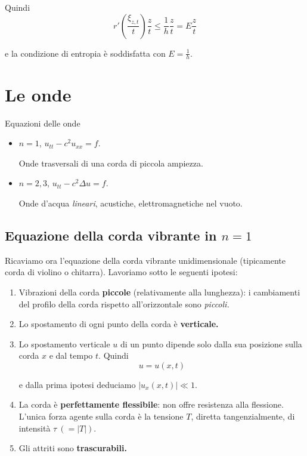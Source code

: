 \documentclass[10pt,a4paper,twoside,openright]{book}
\begin{document}
\begin{dimostrazione}
\begin{itemize}
              Quindi
              \begin{equation*}
                  r'\left(\frac{\xi _{z,t}}{t}\right)\frac{z}{t} \leqslant \frac{1}{h}\frac{z}{t} = E \frac{z}{t}
              \end{equation*}

              e la condizione di entropia è soddisfatta con $\displaystyle E=\frac{1}{h}$.
    \end{itemize}

\end{dimostrazione}

\chapter{Le onde}

Equazioni delle onde
\begin{itemize}
    \item $n=1$, $\displaystyle u_{tt} -c^{2} u_{xx} =f$.

          Onde trasversali di una corda di piccola ampiezza.
    \item $\displaystyle n=2,3$, $\displaystyle u_{tt} -c^{2} \Delta u=f$.

          Onde d'acqua \textit{lineari}, acustiche, elettromagnetiche nel vuoto.
\end{itemize}

\section{Equazione della corda vibrante in \texorpdfstring{$n=1$}{n=1}}

Ricaviamo ora l'equazione della corda vibrante unidimensionale (tipicamente corda di violino o chitarra). Lavoriamo sotto le seguenti ipotesi:
\begin{enumerate}
    \item Vibrazioni della corda \textbf{piccole} (relativamente alla lunghezza): i cambiamenti del profilo della corda rispetto all'orizzontale sono \textit{piccoli.}
    \item Lo spostamento di ogni punto della corda è \textbf{verticale.}
    \item Lo spostamento verticale $u$ di un punto dipende solo dalla sua posizione sulla corda $x$ e dal tempo $t$. Quindi
          \begin{equation*}
              u=u(x,t)
          \end{equation*}

          e dalla prima ipotesi deduciamo $\displaystyle | u_{x}(x,t)| \ll 1$.
    \item La corda è \textbf{perfettamente flessibile}: non offre resistenza alla flessione. L'unica forza agente sulla corda è la tensione $T$, diretta tangenzialmente, di intensità $\displaystyle \tau \ (=| T|)$.
    \item Gli attriti sono \textbf{trascurabili.}
\end{enumerate}
\end{document}
